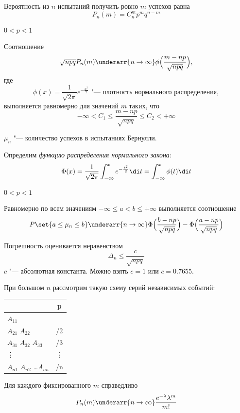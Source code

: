 \begin{statement}
	Вероятность из $ n $ испытаний получить ровно $ m $ успехов равна
	$$ P_n(m) = C_n^m p^mq^{n - m} $$
\end{statement}

\begin{theorem}
	$ 0 < p < 1 $

	Соотношение
    $$ \sqrt{npq}P_n(m) \underarr{n \to \infty} \phi \Bigl( \dfrac{m - np}{\sqrt{npq}} \Bigr), $$
	где
	$$ \phi(x) = \frac1{\sqrt{2\pi}} e^{-\frac{x^2}2}
	\text{ "--- плотность нормального распределения}, $$
	выполняется равномерно для значений $ m $ таких, что
	$$ -\infty < C_1 \le \frac{m - np}{\sqrt{npq}} \le C_2 < +\infty $$
\end{theorem}

\begin{notation}
	$ \mu_n $ "--- количество успехов в испытаниях Бернулли.
\end{notation}

\begin{notation}
	Определим \emph{функцию распределения нормального закона}:
	$$ \Phi(x) = \frac1{\sqrt{2\pi}} \int_{-\infty}^x e^{-\frac{t^2}2} \di t =
	\int_{-\infty}^x \phi(t) \di t $$
\end{notation}

\begin{theorem}
	$ 0 < p < 1 $

	Равномерно по всем значениям $ -\infty \le a < b \le +\infty $ выполняется соотношение
	$$ P\set{a \le \mu_n \le b} \underarr{n \to \infty}
	\Phi \Bigl( \frac{b - np}{\sqrt{npq}} \Bigr) - \Phi \Bigl( \frac{a - np}{\sqrt{npq}} \Bigr) $$
\end{theorem}

Погрешность оценивается неравенством
$$ \Delta_n \le \frac c{\sqrt{npq}} $$
$ c $ "--- абсолютная константа.
Можно взять $ c = 1 $ или $ c = 0.7655 $.

\begin{theorem}
	При большом $ n $ рассмотрим такую схему серий независимых событий: \\
	\begin{tabular}{l | c}
		& p \\
		\hline
		$ A_{11} $ & \lambda \\
		$ A_{21} $ $ A_{22} $ & \lambda/2 \\
		$ A_{31} $ $ A_{32} $ $ A_{33} $ & \lambda/3 \\
		\vdots & \vdots \\
		$ A_{n1} $ $ A_{n2} $ \dots $ A_{nn} $ & \lambda/n
	\end{tabular}

	Для каждого фиксированного $ m $ справедливо
	$$ P_n(m) \underarr{n \to \infty} \frac{e^{-\lambda}\lambda^m}{m!} $$
\end{theorem}

